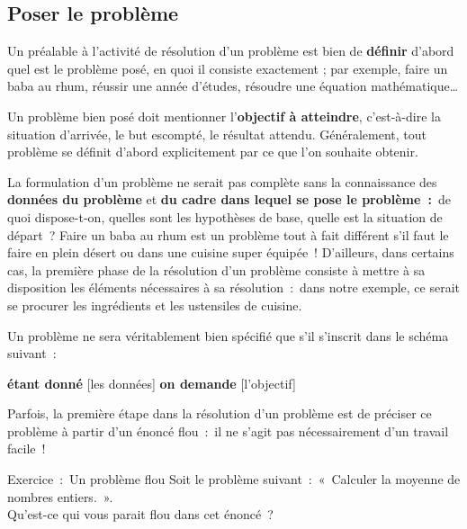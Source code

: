 	\subsection{Poser le problème }
	
		Un préalable à l’activité de résolution d’un problème est bien de
		\textbf{définir} d’abord quel est le problème posé, en quoi il consiste
		exactement ; par exemple, faire un baba au rhum, réussir une année
		d’études, résoudre une équation mathématique\dots
		
		Un problème bien posé doit mentionner l’\textbf{objectif à atteindre},
		c’est-à-dire la situation d’arrivée, le but escompté, le résultat
		attendu. Généralement, tout problème se définit d’abord explicitement
		par ce que l’on souhaite obtenir.
		
		La formulation d’un problème ne serait pas complète sans la connaissance
		des \textbf{données du problème} et \textbf{du cadre dans lequel se
		pose le problème~:}~de quoi dispose-t-on, quelles sont les hypothèses
		de base, quelle est la situation de départ~? Faire un baba au rhum est
		un problème tout à fait différent s’il faut le faire en plein désert ou
		dans une cuisine super équipée~! D’ailleurs, dans certains cas, la
		première phase de la résolution d’un problème consiste à mettre à sa
		disposition les éléments nécessaires à sa résolution~:~dans notre
		exemple, ce serait se procurer les ingrédients et les ustensiles de
		cuisine.
	
		Un problème ne sera véritablement bien spécifié que s’il s’inscrit dans
		le schéma suivant~:
		
		\begin{center}
		\begin{Ovalbox}
		{\textbf{étant donné} [les données] \textbf{on demande} [l’objectif]}
		\end{Ovalbox}
		\end{center}
	
		Parfois, la première étape dans la résolution d’un problème est de
		préciser ce problème à partir d’un énoncé flou~:~il ne s’agit pas
		nécessairement d’un travail facile~!

		\begin{Emphase}[exercice]{Exercice~:~Un problème flou}
			Soit le problème suivant~:~«~Calculer la moyenne de nombres entiers.~».
			\\Qu’est-ce qui vous parait flou dans cet énoncé~?
		\end{Emphase}

